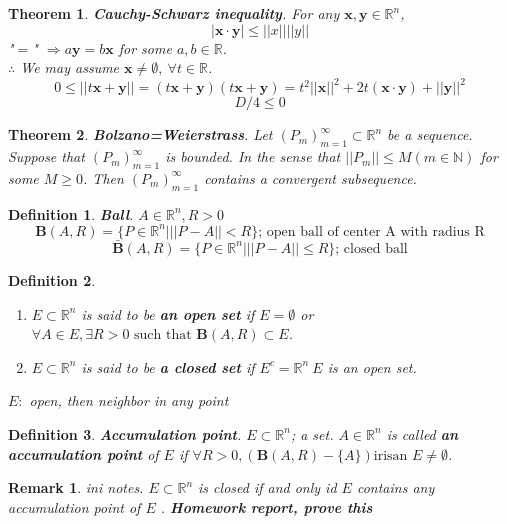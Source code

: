 \documentclass[a4paper,10pt]{article}
\newtheorem{remark}{Remark}
\newtheorem{theo}{Theorem}
\newtheorem{defi}{Definition}
\newcommand{\R}{\mathbb{R}}
\newcommand{\N}{\mathbb{N}}
\newcommand{\bx}{\mathbf{x}}
\newcommand{\by}{\mathbf{y}}
\begin{document}
\begin{theo}
	\textbf{Cauchy-Schwarz inequality}. For any $ \bx, \by \in \R^n $,
	\[ \mid \bx \cdot \by \mid \leq || x || || y || \]
	"$ = $" $ \Rightarrow  a\by = b\bx$ for some $ a,b \in \R $.\\
	$ \therefore $ We may assume $ \bx \neq \emptyset , \ \forall t \in \R $.
	\[ 0 \leq || t\bx+\by || = (t\bx+\by) (t\bx+\by) =  t^2 ||\bx||^2 + 2t(\bx\cdot\by)+||\by||^2 \]
	\[D/4 \leq 0\]
\end{theo}

\begin{theo}
	\textbf{Bolzano=Weierstrass}. Let $ (P_{m})_{m=1}^{\infty} \subset \R^n $ be a sequence. Suppose that $ (P_{m})_{m=1}^{\infty} $ is bounded. In the sense that $ ||P_{m}|| \leq M (m \in \N) $ for some $ M \geq 0 $. Then $ (P_{m})_{m=1}^{\infty} $ contains a convergent subsequence.
\end{theo}

\begin{defi}
	\textbf{Ball}. $ A \in \R^n, R>0 $
	\[ \mathbf{B}(A,R) = \{ P \in \R^n | ||P-A||<R \} \text{; open ball of center A with radius R} \]
	\[ \bar{\mathbf{B}}(A,R) = \{ P \in \R^n | ||P-A||\leq R \} \text{; closed ball} \]
\end{defi}

\begin{defi}
	\begin{enumerate}
		\item $ E \subset \R^n $ is said to be \textbf{an open set} if $ E = \emptyset $ or $ \forall A \in E , \exists R>0 \text{ such that } \mathbf{B}(A,R) \subset E $.
		\item $ E \subset \R^n $ is said to be \textbf{a closed set} if $ E^{c} = \R^n \ E $ is an open set.
	\end{enumerate}
	$ E : $ open, then neighbor in any point %
\end{defi}

\begin{defi}
	\textbf{Accumulation point}. $ E \subset \R^n $; a set. $ A \in \R^n $ is called \textbf{an accumulation point} of $ E $ if $ \forall R>0, (\mathbf{B}(A,R)-\{A\}) \text{irisan } E \neq \emptyset $.
\end{defi}

\begin{remark}
	ini notes. $ E \subset \R^n $ is closed if and only id $ E $ contains any accumulation point of $ E $ . \textbf{Homework report, prove this}
\end{remark}
\end{document}
